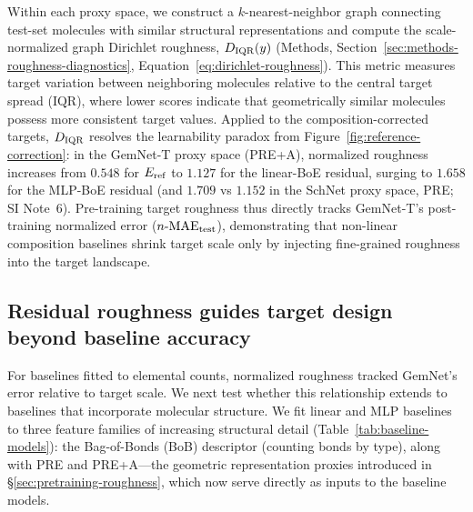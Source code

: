Within each proxy space, we construct a $k$-nearest-neighbor graph connecting test-set molecules with similar structural representations and compute the scale-normalized graph Dirichlet roughness, $D_{\rm IQR}(y)$ (Methods, Section~\ref{sec:methods-roughness-diagnostics}, Equation~\ref{eq:dirichlet-roughness}). This metric measures target variation between neighboring molecules relative to the central target spread ($\text{IQR}$), where lower scores indicate that geometrically similar molecules possess more consistent target values. Applied to the composition-corrected targets, $D_{\rm IQR}$ resolves the learnability paradox from Figure~\ref{fig:reference-correction}: in the GemNet-T proxy space (PRE+A), normalized roughness increases from $0.548$ for $E_{\rm ref}$ to $1.127$ for the linear-BoE residual, surging to $1.658$ for the MLP-BoE residual (and $1.709$ vs $1.152$ in the SchNet proxy space, PRE; SI Note~6). Pre-training target roughness thus directly tracks GemNet-T’s post-training normalized error ($n\text{-MAE}_{\rm test}$), demonstrating that non-linear composition baselines shrink target scale only by injecting fine-grained roughness into the target landscape.

\subsection{Residual roughness guides target design beyond baseline accuracy}
\label{sec:residual-design}

For baselines fitted to elemental counts, normalized roughness tracked GemNet’s error relative to target scale. We next test whether this relationship extends to baselines that incorporate molecular structure. We fit linear and MLP baselines to three feature families of increasing structural detail (Table~\ref{tab:baseline-models}): the Bag-of-Bonds (BoB) descriptor (counting bonds by type), along with PRE and PRE+A—the geometric representation proxies introduced in §\ref{sec:pretraining-roughness}, which now serve directly as inputs to the baseline models.

